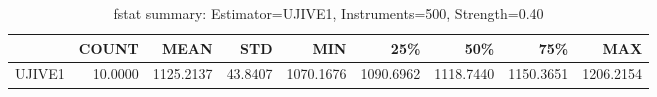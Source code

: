 \begin{table}[ht]
\centering
\caption{fstat summary: Estimator=UJIVE1, Instruments=500, Strength=0.40}
\begin{tabular}{lrrrrrrrr}
\toprule
 & COUNT & MEAN & STD & MIN & 25\% & 50\% & 75\% & MAX \\
\midrule
UJIVE1 & 10.0000 & 1125.2137 & 43.8407 & 1070.1676 & 1090.6962 & 1118.7440 & 1150.3651 & 1206.2154 \\
\bottomrule
\end{tabular}
\end{table}

